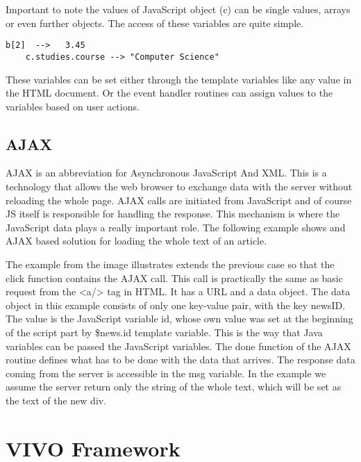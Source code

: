 Important to note the values of JavaScript object (c) can be single values, arrays or even further objects. The access of these variables are quite simple.

\begin{lstlisting}[basicstyle=\footnotesize, frame=single, caption={JavaScript data access}, captionpos=b]
	b[2]  -->   3.45
	c.studies.course --> "Computer Science"
\end{lstlisting}


These variables can be set either through the template variables like any value in the HTML document. Or the event handler routines can assign values to the variables based on user actions.

\subsection{AJAX}

AJAX is an abbreviation for Asynchronous JavaScript And XML. This is a technology that allows the web browser to exchange data with the server without reloading the whole page. AJAX calls are initiated from JavaScript and of course JS itself is responsible for handling the response. This mechanism is where the JavaScript data plays a really important role. The following example shows and AJAX based solution for loading the whole text of an article.


The example from the image illustrates extends the previous case so that the click function contains the AJAX call. This call is practically the same as basic request from the <a/> tag in HTML. It has a URL and a data object. The data object in this example consists of only one key-value pair, with the key newsID. The value is the JavaScript variable id, whose own value was set at the beginning of the script part by \${news.id} template variable. This is the way that Java variables can be passed the JavaScript variables.  The done function of the AJAX routine defines what has to be done with the data that arrives. The response data coming from the server is accessible in the msg variable. In the example we assume the server return only the string of the whole text, which will be set as the text of the new div.




\section{VIVO Framework}

